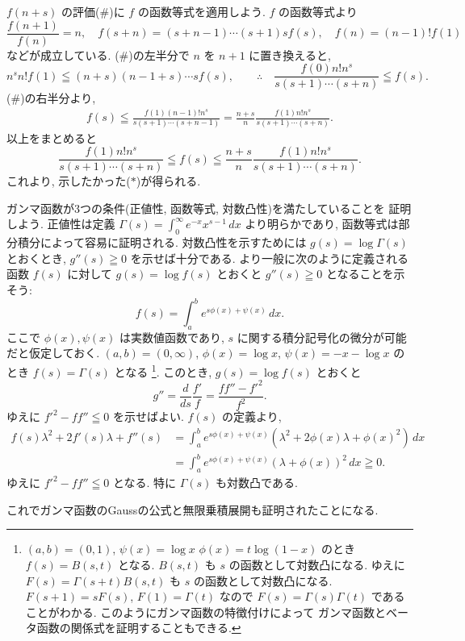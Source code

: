\documentclass[12pt,twoside]{jarticle}
\theoremstyle{jplain}
\theoremstyle{jplain}
\theoremstyle{jplain}
\numberwithin{theorem}{section}
\numberwithin{equation}{section}
\numberwithin{figure}{section}
\numberwithin{table}{section}
\begin{document}
$f(n+s)$ の評価($\#$)に $f$ の函数等式を適用しよう. $f$ の函数等式より
\[
\frac{f(n+1)}{f(n)}=n, \quad
f(s+n)=(s+n-1)\cdots(s+1)sf(s), \quad
f(n)=(n-1)!f(1)
\]
などが成立している.
($\#$)の左半分で $n$ を $n+1$ に置き換えると,
\[
n^s n! f(1)\leqq (n+s)(n-1+s)\cdots s f(s),
\qquad\therefore\quad
\frac{f(0)n!n^s}{s(s+1)\cdots(s+n)}\leqq f(s).
\]
($\#$)の右半分より,
\begin{align*}
f(s)\leqq \frac{f(1)(n-1)!n^s}{s(s+1)\cdots(s+n-1)}
=\frac{n+s}{n}\frac{f(1)n!n^s}{s(s+1)\cdots(s+n)}.
\end{align*}
以上をまとめると
\[
\frac{f(1)n!n^s}{s(s+1)\cdots(s+n)}
\leqq
f(s)
\leqq \frac{n+s}{n}
\frac{f(1)n!n^s}{s(s+1)\cdots(s+n)}.
\]
これより, 示したかった($*$)が得られる.

ガンマ函数が3つの条件(正値性, 函数等式, 対数凸性)を満たしていることを
証明しよう. 正値性は定義 $\Gamma(s)=\int_0^\infty e^{-x}x^{s-1}\,dx$
より明らかであり, 函数等式は部分積分によって容易に証明される.
対数凸性を示すためには $g(s)=\log\Gamma(s)$ とおくとき,
$g''(s)\geqq 0$ を示せば十分である.
より一般に次のように定義される函数 $f(s)$ に対して $g(s)=\log f(s)$
とおくと $g''(s)\geqq 0$ となることを示そう:
\[
f(s)=\int_a^b e^{s\phi(x)+\psi(x)}\,dx.
\]
ここで $\phi(x),\psi(x)$ は実数値函数であり,
$s$ に関する積分記号化の微分が可能だと仮定しておく.
$(a,b)=(0,\infty)$, $\phi(x)=\log x$, $\psi(x)=-x-\log x$ の
とき $f(s)=\Gamma(s)$ となる%
\footnote{$(a,b)=(0,1)$, $\psi(x)=\log x$ $\phi(x)=t\log(1-x)$
のとき $f(s)=B(s,t)$ となる.
$B(s,t)$ も $s$ の函数として対数凸になる.
ゆえに $F(s)=\Gamma(s+t)B(s,t)$ も $s$ の函数として対数凸になる.
$F(s+1)=sF(s)$, $F(1)=\Gamma(t)$ なので $F(s)=\Gamma(s)\Gamma(t)$
であることがわかる. このようにガンマ函数の特徴付けによって
ガンマ函数とベータ函数の関係式を証明することもできる.}.
このとき, $g(s)=\log f(s)$ とおくと
\[
g''
=\frac{d}{ds}\frac{f'}{f}
=\frac{ff''-f'^2}{f^2}.
\]
ゆえに $f'^2-ff''\leqq 0$ を示せばよい.
$f(s)$ の定義より,
\begin{align*}
f(s)\lambda^2+2f'(s)\lambda+f''(s)
&
=\int_a^b e^{s\phi(x)+\psi(x)}(\lambda^2+2\phi(x)\lambda+\phi(x)^2)\,dx
\\ &
=\int_a^b e^{s\phi(x)+\psi(x)}(\lambda+\phi(x))^2\,dx
\geqq 0.
\end{align*}
ゆえに $f'^2-ff''\leqq 0$ となる.
特に $\Gamma(s)$ も対数凸である.

これでガンマ函数のGaussの公式と無限乗積展開も証明されたことになる.
\end{document}

